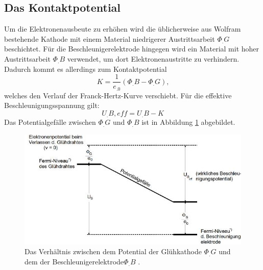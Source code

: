 \subsection{Das Kontaktpotential}
Um die Elektronenausbeute zu erhöhen wird die üblicherweise aus Wolfram bestehende Kathode mit einem Material niedrigerer Austrittsarbeit $\Phi_.G$ beschichtet. Für die Beschleunigerelektrode hingegen wird ein Material mit hoher Austrittsarbeit $\Phi_.B$ verwendet, um dort Elektronenaustritte zu verhindern.
Dadurch kommt es allerdings zum Kontaktpotential
\begin{equation}
K=\frac{1}{e_.0}\left(\Phi_.B-\Phi_.G\right)\text{,}\label{eq:kontakt}
\end{equation}
welches den Verlauf der Franck-Hertz-Kurve verschiebt. Für die effektive Beschleunigungsspannung gilt:
\[
U_.{B,eff}=U_.B-K
\]
Das Potentialgefälle zwischen $\Phi_.G$ und $\Phi_.B$ ist in Abbildung \ref{fig:kontakt} abgebildet.
\begin{figure}
\centering
\includegraphics[width=\linewidth-50pt,height=\textheight-50pt,keepaspectratio]{content/images/kontaktpot.jpg}
\caption{Das Verhältnis zwischen dem Potential der Glühkathode $\Phi_.G$ und dem der Beschleunigerelektrode$\Phi_.B$ \cite{V601}.}
\label{fig:kontakt}
\end{figure}
